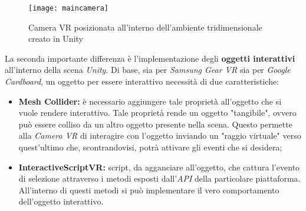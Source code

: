 \label{MainCamera}
\begin{figure}[ht]
	\begin{center}
		\texttt{[image: maincamera]}
		\caption{Camera VR posizionata all'interno dell'ambiente tridimensionale creato in Unity}
	\end{center}
\end{figure}
\FloatBarrier

La seconda importante differenza è l'implementazione degli \textbf{oggetti interattivi} all'interno della scena \textit{Unity}. Di base, sia per \textit{Samsung Gear VR} sia per \textit{Google Cardboard}, un oggetto per essere interattivo necessità di due caratteristiche:

\begin{itemize}
	\item \textbf{Mesh Collider:} è necessario aggiungere tale proprietà all'oggetto che si vuole rendere interattivo. Tale proprietà rende un oggetto "tangibile", ovvero può essere colliso da un altro oggetto presente nella scena. Questo permette alla \textit{Camera VR} di interagire con l'oggetto inviando un "raggio virtuale" verso quest'ultimo che, scontrandovisi, potrà attivare gli eventi che si desidera;
	\item \textbf{InteractiveScriptVR:} script, da agganciare all'oggetto, che cattura l'evento di selezione attraverso i metodi esposti dall'\textit{API} della particolare piattaforma. All'interno di questi metodi si può implementare il vero comportamento dell'oggetto interattivo.  
\end{itemize}

